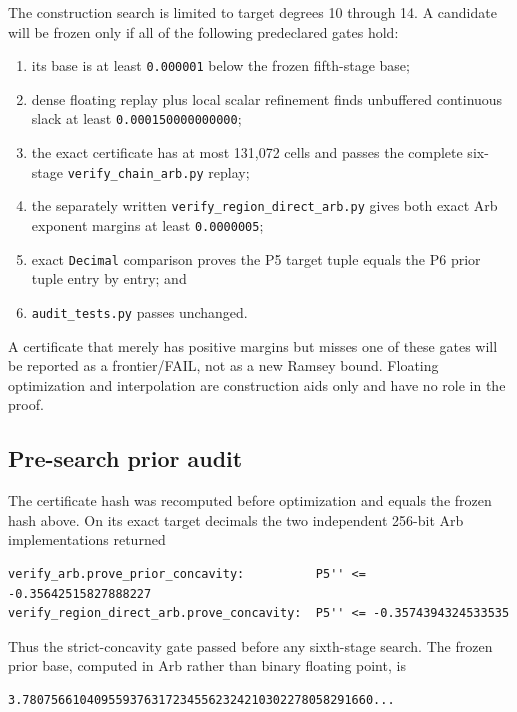 The construction search is limited to target degrees 10 through 14. A
candidate will be frozen only if all of the following predeclared gates
hold:

\begin{enumerate}
\def\labelenumi{\arabic{enumi}.}
\tightlist
\item
  its base is at least \texttt{0.000001} below the frozen fifth-stage
  base;
\item
  dense floating replay plus local scalar refinement finds unbuffered
  continuous slack at least \texttt{0.000150000000000};
\item
  the exact certificate has at most 131,072 cells and passes the
  complete six-stage \texttt{verify\_chain\_arb.py} replay;
\item
  the separately written \texttt{verify\_region\_direct\_arb.py} gives
  both exact Arb exponent margins at least \texttt{0.0000005};
\item
  exact \texttt{Decimal} comparison proves the P5 target tuple equals
  the P6 prior tuple entry by entry; and
\item
  \texttt{audit\_tests.py} passes unchanged.
\end{enumerate}

A certificate that merely has positive margins but misses one of these
gates will be reported as a frontier/FAIL, not as a new Ramsey bound.
Floating optimization and interpolation are construction aids only and
have no role in the proof.

\subsection{Pre-search prior audit}

The certificate hash was recomputed before optimization and equals the
frozen hash above. On its exact target decimals the two independent
256-bit Arb implementations returned

\begin{verbatim}
verify_arb.prove_prior_concavity:          P5'' <= -0.35642515827888227
verify_region_direct_arb.prove_concavity:  P5'' <= -0.3574394324533535
\end{verbatim}

Thus the strict-concavity gate passed before any sixth-stage search. The
frozen prior base, computed in Arb rather than binary floating point, is

\begin{verbatim}
3.7807566104095593763172345562324210302278058291660...
\end{verbatim}

